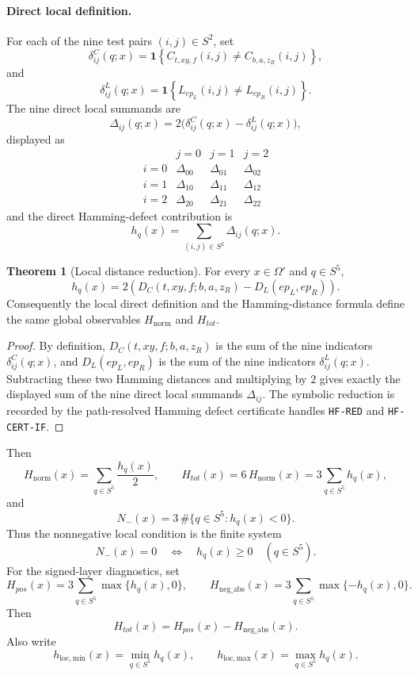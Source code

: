 \documentclass[11pt]{article}
\theoremstyle{definition}
\newtheorem{theorem}{Theorem}[section]
\begin{document}
\paragraph{Direct local definition.}
For each of the nine test pairs \((i,j)\in S^2\), set
\[
\delta^C_{ij}(q;x)
=
\mathbf 1\!\left\{
C_{t,xy,f}(i,j)\ne C_{b,a,z_R}(i,j)
\right\},
\]
and
\[
\delta^L_{ij}(q;x)
=
\mathbf 1\!\left\{
L_{ep_L}(i,j)\ne L_{ep_R}(i,j)
\right\}.
\]
The nine direct local summands are
\[
\Delta_{ij}(q;x)=2\bigl(\delta^C_{ij}(q;x)-\delta^L_{ij}(q;x)\bigr),
\]
displayed as
\[
\begin{array}{c|ccc}
 & j=0 & j=1 & j=2\\
\hline
i=0 & \Delta_{00} & \Delta_{01} & \Delta_{02}\\
i=1 & \Delta_{10} & \Delta_{11} & \Delta_{12}\\
i=2 & \Delta_{20} & \Delta_{21} & \Delta_{22}
\end{array}
\]
and the direct Hamming-defect contribution is
\[
h_q(x)
=
\sum_{(i,j)\in S^2}\Delta_{ij}(q;x).
\]

\begin{theorem}[Local distance reduction]
\label{thm:7.1}
For every \(x\in\Omega'\) and \(q\in S^5\),
\[
\boxed{
h_q(x)=
2\left(
D_C(t,xy,f;b,a,z_R)-D_L(ep_L,ep_R)
\right).
}
\]
Consequently the local direct definition and the Hamming-distance formula
define the same global observables \(H_{\mathrm{norm}}\) and \(H_{tot}\).
\end{theorem}

\begin{proof}
By definition, \(D_C(t,xy,f;b,a,z_R)\) is the sum of the nine indicators
\(\delta^C_{ij}(q;x)\), and \(D_L(ep_L,ep_R)\) is the sum of the nine
indicators \(\delta^L_{ij}(q;x)\). Subtracting these two Hamming
distances and multiplying by \(2\) gives exactly the displayed sum of
the nine direct local summands \(\Delta_{ij}\). The symbolic reduction is recorded by the path-resolved Hamming defect
certificate handles \texttt{HF-RED} and \texttt{HF-CERT-IF}.
\end{proof}

Then
\[
H_{\mathrm{norm}}(x)=\sum_{q\in S^5}\frac{h_q(x)}2,
\qquad
H_{tot}(x)=6\,H_{\mathrm{norm}}(x)=3\sum_{q\in S^5}h_q(x),
\]
and
\[
\boxed{
N_-(x)=3\,\#\{q\in S^5:h_q(x)<0\}.
}
\]
Thus the nonnegative local condition is the finite system
\[
N_-(x)=0
\quad\Longleftrightarrow\quad
h_q(x)\ge0\quad(q\in S^5).
\]
For the signed-layer diagnostics, set
\[
H_{pos}(x)=3\sum_{q\in S^5}\max\{h_q(x),0\},
\qquad
H_{\mathrm{neg\_abs}}(x)=3\sum_{q\in S^5}\max\{-h_q(x),0\}.
\]
Then
\[
H_{tot}(x)=H_{pos}(x)-H_{\mathrm{neg\_abs}}(x).
\]
Also write
\[
h_{\mathrm{loc,min}}(x)=\min_{q\in S^5}h_q(x),
\qquad
h_{\mathrm{loc,max}}(x)=\max_{q\in S^5}h_q(x).
\]
\end{document}
